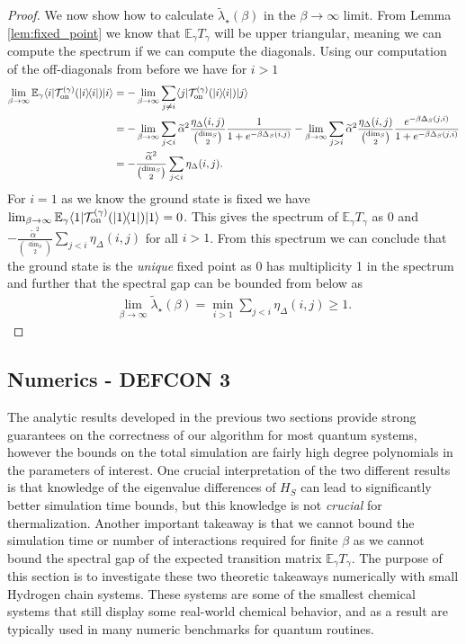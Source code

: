 \documentclass{article}
\newcommand{\on}{\rm on}
\newcommand{\ket}[1]{|#1\rangle}
\newcommand{\bra}[1]{\langle #1|}
\newcommand{\ketbra}[2]{| #1\rangle\! \langle #2|}
\newcommand{\EE}{\mathbb{E}}
\newcommand{\TT}{\mathcal{T}}
\begin{document}
\begin{proof}
We now show how to calculate $\widetilde{\lambda}_\star(\beta)$ in the $\beta \to \infty$ limit. From Lemma \ref{lem:fixed_point} we know that $\EE_\gamma T_\gamma$ will be upper triangular, meaning we can compute the spectrum if we can compute the diagonals. Using our computation of the off-diagonals from before we have for $i > 1$
\begin{align}
    \lim_{\beta \to \infty} \EE_\gamma \bra{i} \TT_{\on}^{(\gamma)}(\ketbra{i}{i}) \ket{i} &= - \lim_{\beta \to \infty} \sum_{j \neq i} \bra{j} \TT_{\on}^{(\gamma)}(\ketbra{i}{i}) \ket{j} \\
    &= - \lim_{\beta \to \infty} \sum_{j < i} \widetilde{\alpha}^2 \frac{\eta_\Delta(i,j)}{\binom{\dim_S}{2}} \frac{1}{1 + e^{-\beta \Delta_S(i,j)}} - \lim_{\beta \to \infty} \sum_{j > i} \widetilde{\alpha}^2 \frac{\eta_\Delta(i,j)}{\binom{\dim_S}{2}} \frac{e^{-\beta \Delta_S(j, i)}}{1 + e^{-\beta \Delta_S(j, i)}} \\
    &= - \frac{\widetilde{\alpha}^2}{\binom{\dim_S}{2}} \sum_{j < i} \eta_\Delta(i,j).
\end{align}
For $i = 1$ as we know the ground state is fixed we have $\lim_{\beta \to \infty} \EE_\gamma \bra{1} \TT_{\on}^{(\gamma)}(\ketbra{1}{1}) \ket{1} = 0$. This gives the spectrum of $\EE_\gamma T_\gamma$ as 0 and $- \frac{\widetilde{\alpha}^2}{\binom{\dim_S}{2}} \sum_{j < i} \eta_\Delta(i,j)$ for all $i > 1$. From this spectrum we can conclude that the ground state is the \emph{unique} fixed point as 0 has multiplicity 1 in the spectrum and further that the spectral gap can be bounded from below as
\begin{align}
    \lim_{\beta \to \infty} \widetilde{\lambda}_\star(\beta) = \min_{i > 1} \sum_{j < i} \eta_\Delta(i,j) \ge 1.
\end{align}
\end{proof}

\subsection{Numerics - DEFCON 3} \label{sec:general_numerics}

The analytic results developed in the previous two sections provide strong guarantees on the correctness of our algorithm for most quantum systems, however the bounds on the total simulation are fairly high degree polynomials in the parameters of interest. One crucial interpretation of the two different results is that knowledge of the eigenvalue differences of $H_S$ can lead to significantly better simulation time bounds, but this knowledge is not \emph{crucial} for thermalization. Another important takeaway is that we cannot bound the simulation time or number of interactions required for finite $\beta$ as we cannot bound the spectral gap of the expected transition matrix $\EE_\gamma T_\gamma$. The purpose of this section is to investigate these two theoretic takeaways numerically with small Hydrogen chain systems. These systems are some of the smallest chemical systems that still display some real-world chemical behavior, and as a result are typically used in many numeric benchmarks for quantum routines. 
\end{document}
